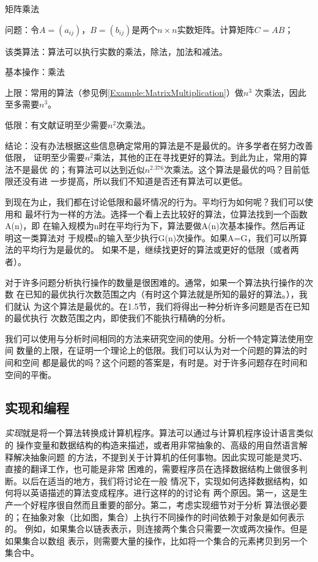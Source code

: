 \begin{example}
矩阵乘法

问题：令$A=(a_{ij})$，$B=(b_{ij})$是两个$n \times
n$实数矩阵。计算矩阵$C=AB$；

该类算法：算法可以执行实数的乘法，除法，加法和减法。

基本操作：乘法

上限：常用的算法（参见例\ref{Example:MatrixMultiplication}）做$n^3$
次乘法，因此至多需要$n^3$。

低限：有文献证明至少需要$n^2$次乘法。

结论：没有办法根据这些信息确定常用的算法是不是最优的。许多学者在努力改善低限，
证明至少需要$n^2$乘法，其他的正在寻找更好的算法。到此为止，常用的算法不是最优
的；有算法可以达到近似$n^2.376$次乘法。这个算法是最优的吗？目前低限还没有进
一步提高，所以我们不知道是否还有算法可以更低。

\end{example}

到现在为止，我们都在讨论低限和最坏情况的行为。平均行为如何呢？我们可以使用和
最坏行为一样的方法。选择一个看上去比较好的算法，位算法找到一个函数A(n)，即
在输入规模为n时在平均行为下，算法要做A(n)次基本操作。然后再证明这一类算法对
于规模n的输入至少执行G(n)次操作。如果A=G，我们可以所算法的平均行为是最优的。
如果不是，继续找更好的算法或更好的低限（或者两者）。

对于许多问题分析执行操作的数量是很困难的。通常，如果一个算法执行操作的次数
在已知的最优执行次数范围之内（有时这个算法就是所知的最好的算法。），我们就认
为这个算法是最优的。在1.5节，我们将得出一种分析许多问题是否在已知的最优执行
次数范围之内，即使我们不能执行精确的分析。

我们可以使用与分析时间相同的方法来研究空间的使用。分析一个特定算法使用空间
数量的上限，在证明一个理论上的低限。我们可以认为对一个问题的算法的时间和空间
都是最优的吗？这个问题的答案是，有时是。对于许多问题存在时间和空间的平衡。

\subsection{实现和编程}
\emph{实现}就是将一个算法转换成计算机程序。算法可以通过与计算机程序设计语言类似的
操作变量和数据结构的构造来描述，或者用非常抽象的、高级的用自然语言解释解决抽象问题
的方法，不提到关于计算机的任何事物。因此实现可能是灵巧、直接的翻译工作，也可能是非常
困难的，需要程序员在选择数据结构上做很多判断。以后在适当的地方，我们将讨论在一般
情况下，实现如何选择数据结构，如何将以英语描述的算法变成程序。进行这样的的讨论有
两个原因。第一，这是生产一个好程序很自然而且重要的部分。第二，考虑实现细节对于分析
算法很必要的；在抽象对象（比如图，集合）上执行不同操作的时间依赖于对象是如何表示的。
例如，如果集合以链表表示，则连接两个集合只需要一次或两次操作。但是如果集合以数组
表示，则需要大量的操作，比如将一个集合的元素拷贝到另一个集合中。

